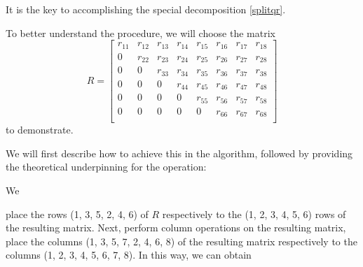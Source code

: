 \documentclass{book}
\makeatletter
\def\my@tag@font{\normalsize}
\let\amsmath@eqref\eqref
\renewcommand\eqref[1]{{\let\my@tag@font\relax\amsmath@eqref{#1}}}
\theoremstyle{remark}
\makeatother
\begin{document}
\begin{multicols}{2}
It is the key to accomplishing the special decomposition \eqref{splitqr}.

To better understand the procedure, we will choose the matrix 
\[R= \begin{bmatrix}
 r_{11} & r_{12} & r_{13} & r_{14} & r_{15} & r_{16} & r_{17} & r_{18}\\
 0      & r_{22} & r_{23} & r_{24} & r_{25} & r_{26} & r_{27} & r_{28}\\
 0      & 0      & r_{33} & r_{34} & r_{35} & r_{36} & r_{37} & r_{38}\\
 0      & 0      & 0      & r_{44} & r_{45} & r_{46} & r_{47} & r_{48}\\
 0      & 0      & 0      & 0      & r_{55} & r_{56} & r_{57} & r_{58}\\
 0      & 0      & 0      & 0      & 0      & r_{66} & r_{67} & r_{68}\\
\end{bmatrix}
\]
to demonstrate. 

We will first describe how to achieve this in the algorithm, followed by providing the theoretical underpinning for the operation:

We 

place the rows (1, 3, 5, 2, 4, 6) of $R$ respectively to the (1, 2, 3, 4, 5, 6) rows of the resulting matrix.  Next, perform column operations on the resulting matrix, place the columns (1, 3, 5, 7, 2, 4, 6, 8) of the resulting matrix respectively to the columns (1, 2, 3, 4, 5, 6, 7, 8). In this way, we can obtain


\end{multicols}
\end{document}
